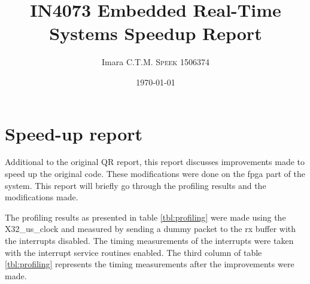 \documentclass{article}
\title{IN4073 Embedded Real-Time Systems Speedup Report} %
\author{Imara C.T.M. \textsc{Speek} 1506374} %
\date{\today} %
\begin{document}
\maketitle %


\section{Speed-up report}
\label{sec:introduction}
Additional to the original QR report, this report discusses improvements made to speed up the original code. These modifications were done on the fpga part of the system. This report will briefly go through the profiling results and the modifications made.


The profiling results as presented in table \ref{tbl:profiling} were made using the X32\_us\_clock and measured by sending a dummy packet to the rx buffer with the interrupts disabled. The timing measurements of the interrupts were taken with the interrupt service routines enabled. The third column of table \ref{tbl:profiling} represents the timing measurements after the improvements were made. 
\end{document}
